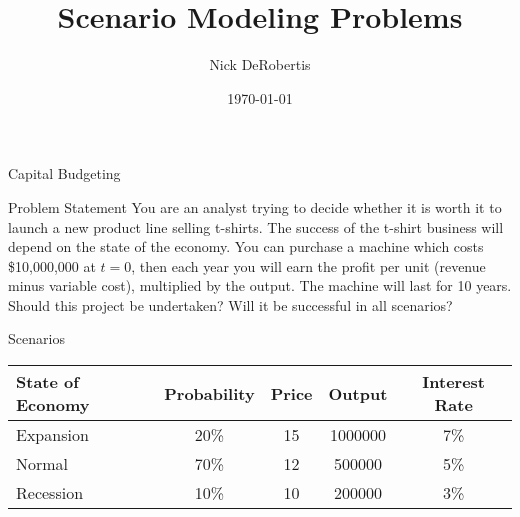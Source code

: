 \documentclass[]{article}
\begin{document}
\title{Scenario Modeling Problems}
\author{Nick DeRobertis}
\date{\today}
\maketitle
\begin{section}{Capital Budgeting}
\begin{subsection}{Problem Statement}
You are an analyst trying to decide whether it is worth it to launch a new product line selling t-shirts. The success of the t-shirt business will depend on the state of the economy. You can purchase a machine which costs \$10,000,000 at $t=0$, then each year you will earn the profit per unit (revenue minus variable cost), multiplied by the output. The machine will last for 10 years. Should this project be undertaken? Will it be successful in all scenarios?
\end{subsection}
\begin{subsection}{Scenarios}
\begin{center}
\begin{tabular}{l|cccc}
\toprule
State of Economy & Probability & Price & Output & Interest Rate\\

\midrule
Expansion & 20\% & 15 & 1000000 & 7\%\\
Normal & 70\% & 12 & 500000 & 5\%\\
Recession & 10\% & 10 & 200000 & 3\%\\

\bottomrule
\end{tabular}
\end{center}
\end{subsection}
\end{section}
\end{document}
